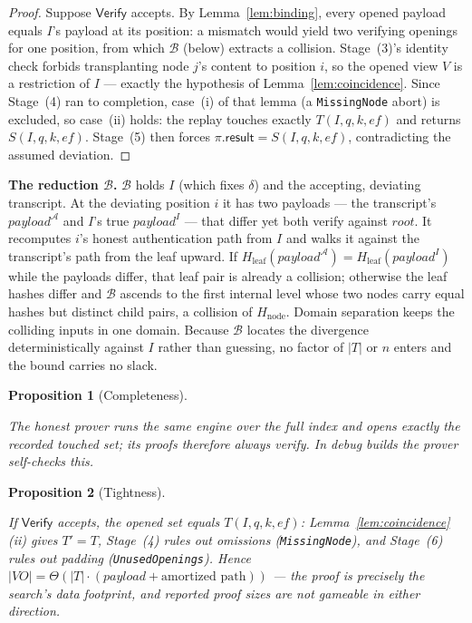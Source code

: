 \documentclass[11pt]{article}
\newtheorem{proposition}{Proposition}
\begin{document}
\begin{proof}

Suppose $\mathsf{Verify}$ accepts. By Lemma~\ref{lem:binding}, every
opened payload equals $I$'s payload at its position: a mismatch would
yield two verifying openings for one position, from which $\mathcal{B}$
(below) extracts a collision. Stage~(3)'s identity check forbids
transplanting node $j$'s content to position $i$, so the opened view $V$
is a restriction of $I$ --- exactly the hypothesis of
Lemma~\ref{lem:coincidence}. Since Stage~(4) ran to completion, case~(i)
of that lemma (a \texttt{MissingNode} abort) is excluded, so case~(ii)
holds: the replay touches exactly $T(I,q,k,\mathit{ef})$ and returns
$S(I,q,k,\mathit{ef})$. Stage~(5) then forces
$\pi.\mathsf{result}=S(I,q,k,\mathit{ef})$, contradicting the assumed
deviation.

\end{proof}

\noindent\textbf{The reduction $\mathcal{B}$.} $\mathcal{B}$ holds $I$
(which fixes $\delta$) and the accepting, deviating transcript. At the
deviating position $i$ it has two payloads --- the transcript's
$\mathit{payload}^{\mathcal{A}}$ and $I$'s true $\mathit{payload}^{I}$
--- that differ yet both verify against $\mathit{root}$. It recomputes
$i$'s honest authentication path from $I$ and walks it against the
transcript's path from the leaf upward. If
$H_{\mathrm{leaf}}(\mathit{payload}^{\mathcal{A}})=H_{\mathrm{leaf}}(\mathit{payload}^{I})$
while the payloads differ, that leaf pair is already a collision;
otherwise the leaf hashes differ and $\mathcal{B}$ ascends to the first
internal level whose two nodes carry equal hashes but distinct child
pairs, a collision of $H_{\mathrm{node}}$. Domain separation keeps the
colliding inputs in one domain. Because $\mathcal{B}$ locates the
divergence deterministically against $I$ rather than guessing, no factor
of $|T|$ or $n$ enters and the bound carries no slack.

\begin{proposition}[Completeness]\label{prop:complete}

The honest prover runs the same engine over the full index and opens
exactly the recorded touched set; its proofs therefore always verify. In
debug builds the prover self-checks this.

\end{proposition}

\begin{proposition}[Tightness]\label{prop:tight}

If $\mathsf{Verify}$ accepts, the opened set equals
$T(I,q,k,\mathit{ef})$: Lemma~\ref{lem:coincidence}(ii) gives $T'=T$,
Stage~(4) rules out omissions (\texttt{MissingNode}), and Stage~(6)
rules out padding (\texttt{UnusedOpenings}). Hence
$|\mathit{VO}|=\Theta(|T|\cdot(\mathit{payload}+\text{amortized path}))$
--- the proof is precisely the search's data footprint, and reported
proof sizes are not gameable in either direction.

\end{proposition}
\end{document}
